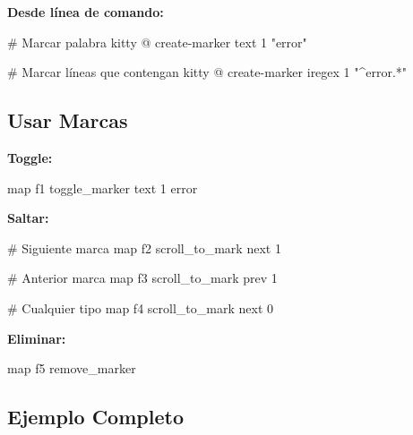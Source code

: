 \documentclass[
  doc,
  floatsintext,
  longtable,
  a4paper,
  nolmodern,
  notxfonts,
  notimes,
  12pt,
  colorlinks=true,linkcolor=blue,citecolor=blue,urlcolor=blue]{apa7}
\newenvironment{Shaded}{\begin{snugshade}}{\end{snugshade}}
\newcommand{\CommentTok}[1]{\textcolor[rgb]{0.37,0.37,0.37}{#1}}
\newcommand{\DataTypeTok}[1]{\textcolor[rgb]{0.68,0.00,0.00}{#1}}
\newcommand{\ExtensionTok}[1]{\textcolor[rgb]{0.00,0.23,0.31}{#1}}
\newcommand{\NormalTok}[1]{\textcolor[rgb]{0.00,0.23,0.31}{#1}}
\newcommand{\StringTok}[1]{\textcolor[rgb]{0.13,0.47,0.30}{#1}}
\begin{document}
\textbf{Desde línea de comando:}

\begin{Shaded}
\begin{Highlighting}[]
\CommentTok{\# Marcar palabra}
\ExtensionTok{kitty}\NormalTok{ @ create{-}marker text 1 }\StringTok{"error"}

\CommentTok{\# Marcar líneas que contengan}
\ExtensionTok{kitty}\NormalTok{ @ create{-}marker iregex 1 }\StringTok{"\^{}error.*"}
\end{Highlighting}
\end{Shaded}

\subsection{Usar Marcas}\label{usar-marcas}

\textbf{Toggle:}

\begin{Shaded}
\begin{Highlighting}[]
\DataTypeTok{map} \DataTypeTok{f1} \DataTypeTok{toggle\_marker} \DataTypeTok{text} \DataTypeTok{1} \DataTypeTok{error}
\end{Highlighting}
\end{Shaded}

\textbf{Saltar:}

\begin{Shaded}
\begin{Highlighting}[]
\CommentTok{\# Siguiente marca}
\DataTypeTok{map} \DataTypeTok{f2} \DataTypeTok{scroll\_to\_mark} \DataTypeTok{next} \DataTypeTok{1}

\CommentTok{\# Anterior marca}
\DataTypeTok{map} \DataTypeTok{f3} \DataTypeTok{scroll\_to\_mark} \DataTypeTok{prev} \DataTypeTok{1}

\CommentTok{\# Cualquier tipo}
\DataTypeTok{map} \DataTypeTok{f4} \DataTypeTok{scroll\_to\_mark} \DataTypeTok{next} \DataTypeTok{0}
\end{Highlighting}
\end{Shaded}

\textbf{Eliminar:}

\begin{Shaded}
\begin{Highlighting}[]
\DataTypeTok{map} \DataTypeTok{f5} \DataTypeTok{remove\_marker}
\end{Highlighting}
\end{Shaded}

\subsection{Ejemplo Completo}\label{ejemplo-completo-1}
\end{document}
